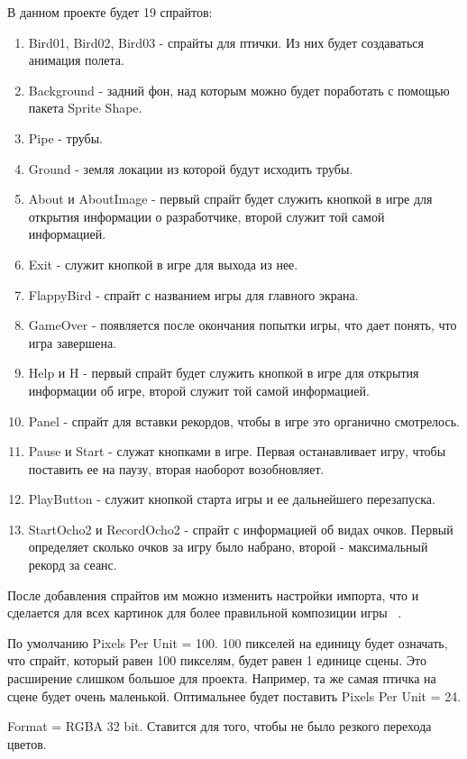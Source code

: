 \documentclass[14pt, oneside]{altsu-report}
\begin{document}
В данном проекте будет 19 спрайтов:

\begin{enumerate}
\item Bird01, Bird02, Bird03 - спрайты для птички. Из них будет создаваться анимация полета.
\item Background - задний фон, над которым можно будет поработать с помощью пакета Sprite Shape.
\item Pipe - трубы.
\item Ground - земля локации из которой будут исходить трубы.
\item About и AboutImage - первый спрайт будет служить кнопкой в игре для открытия информации о разработчике, второй служит той самой информацией.
\item Exit - служит кнопкой в игре для выхода из нее.
\item FlappyBird - спрайт с названием игры для главного экрана.
\item GameOver - появляется после окончания попытки игры, что дает понять, что игра завершена.
\item Help и H - первый спрайт будет служить кнопкой в игре для открытия информации об игре, второй служит той самой информацией.
\item Panel - спрайт для вставки рекордов, чтобы в игре это органично смотрелось.
\item Pause и Start - служат кнопками в игре. Первая останавливает игру, чтобы поставить ее на паузу, вторая наоборот возобновляет.
\item PlayButton - служит кнопкой старта игры и ее дальнейшего перезапуска.
\item StartOcho2 и RecordOcho2 - спрайт с информацией об видах очков. Первый определяет сколько очков за игру было набрано, второй - максимальный рекорд за сеанс.
\end{enumerate} 

После добавления спрайтов им можно изменить настройки импорта, что и сделается для всех картинок для более правильной композиции игры ~\cite{Unity12}.

По умолчанию Pixels Per Unit = 100. 100 пикселей на единицу будет означать, что спрайт, который равен 100 пикселям, будет равен 1 единице сцены. Это расширение слишком большое для проекта. Например, та же самая птичка на сцене будет очень маленькой. Оптимальнее будет поставить Pixels Per Unit = 24.

Format = RGBA 32 bit. Ставится для того, чтобы не было резкого перехода цветов.
\end{document}
